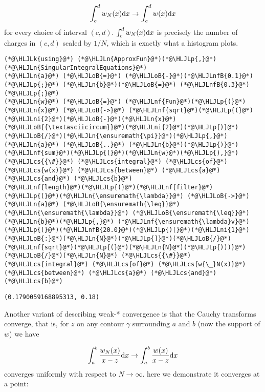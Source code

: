 \documentclass[12pt,a4paper]{article}
\newcommand{\HLJLk}[1]{\textcolor[RGB]{148,91,176}{\textbf{#1}}}
\newcommand{\HLJLn}[1]{#1}
\newcommand{\HLJLnf}[1]{\textcolor[RGB]{66,102,213}{#1}}
\newcommand{\HLJLnfB}[1]{\textcolor[RGB]{59,151,46}{#1}}
\newcommand{\HLJLni}[1]{\textcolor[RGB]{59,151,46}{#1}}
\newcommand{\HLJLoB}[1]{\textcolor[RGB]{102,102,102}{\textbf{#1}}}
\newcommand{\HLJLp}[1]{#1}
\newcommand{\HLJLcs}[1]{\textcolor[RGB]{153,153,119}{\textit{#1}}}
\def\D{ {\rm d} }
\def\dx{\D x}
\begin{document}
\[
   \int_c^d w_N(x) \dx \rightarrow \int_c^d w(x) \dx
\]
for every choice of interval $(c,d)$. $\int_c^d w_N(x) \dx$ is precisely the number of charges in $(c,d)$ scaled by $1/N$,  which is exactly what a histogram plots.


\begin{lstlisting}
(*@\HLJLk{using}@*) (*@\HLJLn{ApproxFun}@*)(*@\HLJLp{,}@*) (*@\HLJLn{SingularIntegralEquations}@*)
(*@\HLJLn{a}@*) (*@\HLJLoB{=}@*) (*@\HLJLoB{-}@*)(*@\HLJLnfB{0.1}@*)(*@\HLJLp{;}@*) (*@\HLJLn{b}@*)(*@\HLJLoB{=}@*) (*@\HLJLnfB{0.3}@*)(*@\HLJLp{;}@*)
(*@\HLJLn{w}@*) (*@\HLJLoB{=}@*) (*@\HLJLnf{Fun}@*)(*@\HLJLp{(}@*)(*@\HLJLn{x}@*) (*@\HLJLoB{->}@*) (*@\HLJLnf{sqrt}@*)(*@\HLJLp{(}@*)(*@\HLJLni{2}@*)(*@\HLJLoB{-}@*)(*@\HLJLn{x}@*)(*@\HLJLoB{{\textasciicircum}}@*)(*@\HLJLni{2}@*)(*@\HLJLp{)}@*)(*@\HLJLoB{/}@*)(*@\HLJLn{\ensuremath{\pi}}@*)(*@\HLJLp{,}@*) (*@\HLJLn{a}@*) (*@\HLJLoB{..}@*) (*@\HLJLn{b}@*)(*@\HLJLp{)}@*)
(*@\HLJLnf{sum}@*)(*@\HLJLp{(}@*)(*@\HLJLn{w}@*)(*@\HLJLp{),}@*)  (*@\HLJLcs{{\#}}@*) (*@\HLJLcs{integral}@*) (*@\HLJLcs{of}@*) (*@\HLJLcs{w(x)}@*) (*@\HLJLcs{between}@*) (*@\HLJLcs{a}@*) (*@\HLJLcs{and}@*) (*@\HLJLcs{b}@*)
(*@\HLJLnf{length}@*)(*@\HLJLp{(}@*)(*@\HLJLnf{filter}@*)(*@\HLJLp{(}@*)(*@\HLJLn{\ensuremath{\lambda}}@*) (*@\HLJLoB{->}@*) (*@\HLJLn{a}@*) (*@\HLJLoB{\ensuremath{\leq}}@*) (*@\HLJLn{\ensuremath{\lambda}}@*) (*@\HLJLoB{\ensuremath{\leq}}@*) (*@\HLJLn{b}@*)(*@\HLJLp{,}@*) (*@\HLJLnf{\ensuremath{\lambda}v}@*)(*@\HLJLp{(}@*)(*@\HLJLnfB{20.0}@*)(*@\HLJLp{)[}@*)(*@\HLJLni{1}@*)(*@\HLJLoB{:}@*)(*@\HLJLn{N}@*)(*@\HLJLp{]}@*)(*@\HLJLoB{/}@*)(*@\HLJLnf{sqrt}@*)(*@\HLJLp{(}@*)(*@\HLJLn{N}@*)(*@\HLJLp{)))}@*)(*@\HLJLoB{/}@*)(*@\HLJLn{N}@*) (*@\HLJLcs{{\#}}@*) (*@\HLJLcs{integral}@*) (*@\HLJLcs{of}@*) (*@\HLJLcs{w{\_}N(x)}@*) (*@\HLJLcs{between}@*) (*@\HLJLcs{a}@*) (*@\HLJLcs{and}@*) (*@\HLJLcs{b}@*)
\end{lstlisting}

\begin{lstlisting}
(0.1790059168895313, 0.18)
\end{lstlisting}


Another variant of describing weak-* convergence is that the Cauchy transforms converge, that is, for $z$ on any  contour $\gamma$ surrounding $a$ and $b$ (now the support of $w$) we have

\[
\int_a^b {w_N(x) \over x - z} \dx \rightarrow \int_a^b {w(x) \over x - z} \dx
\]
converges uniformly with respect to $N \rightarrow \infty$. here we demonstrate it converges at a point:
\end{document}
